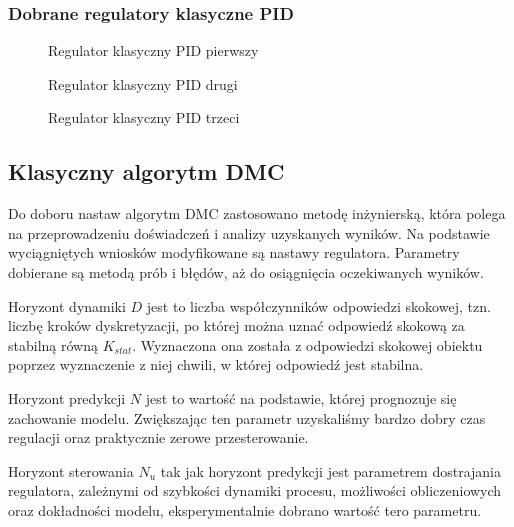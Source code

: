 \subsubsection{Dobrane regulatory klasyczne PID}

\begin{figure}[H] 
    \centering
    
    \caption{Regulator klasyczny PID pierwszy}
    \label{projekt:zad4::PID1:figure}
\end{figure}

\begin{figure}[H] 
    \centering
    
    \caption{Regulator klasyczny PID drugi}
    \label{projekt:zad4::PID2:figure}
\end{figure}

\begin{figure}[H] 
    \centering
    
    \caption{Regulator klasyczny PID trzeci}
    \label{projekt:zad4::PID3:figure}
\end{figure}


\subsection{Klasyczny algorytm DMC}
\label{projekt:zad4:DMC}

Do doboru nastaw algorytm DMC zastosowano metodę inżynierską, 
która polega na przeprowadzeniu doświadczeń i analizy uzyskanych wyników. 
Na podstawie wyciągniętych wniosków modyfikowane są nastawy regulatora. 
Parametry  dobierane są metodą prób i błędów, aż do osiągnięcia oczekiwanych wyników.

\indent Horyzont dynamiki $D$ jest to liczba współczynników odpowiedzi skokowej, 
tzn. liczbę kroków dyskretyzacji, po której można uznać odpowiedź skokową za stabilną równą $K_{stat}$. 
Wyznaczona ona została z odpowiedzi skokowej obiektu poprzez wyznaczenie z niej chwili, 
w której odpowiedź jest stabilna.

\indent Horyzont predykcji $N$ jest to wartość na podstawie, 
której prognozuje się zachowanie modelu. 
Zwiększając ten parametr uzyskaliśmy bardzo dobry czas regulacji oraz praktycznie zerowe przesterowanie.

\indent Horyzont sterowania $N_{u}$ tak jak horyzont predykcji jest parametrem dostrajania regulatora, 
zależnymi od szybkości dynamiki procesu, możliwości obliczeniowych oraz dokładności modelu, 
eksperymentalnie dobrano wartość tero parametru.

